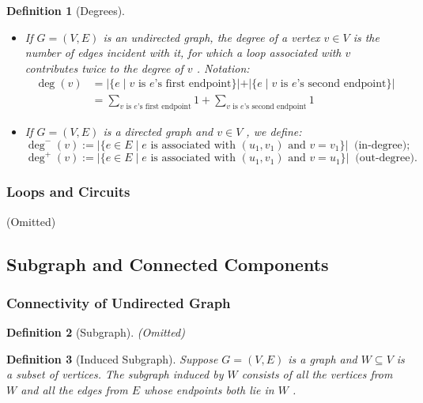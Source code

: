 \documentclass{ctexart}
\newcommand{\。}{．} %
\newenvironment{kuang3}{
    \begin{tcolorbox}[enhanced, breakable, colback=hlan!5!white, boxrule=0pt, frame hidden,
        borderline south={0.5mm}{0.1mm}{hlan}]
    }
    {\end{tcolorbox}}
\newenvironment{lvse}{
    \begin{tcolorbox}[enhanced, breakable, colback=qlv, boxrule=0pt, frame hidden,
        borderline west={0.7mm}{0.1mm}{slv}]
    }
    {\end{tcolorbox}}
\theoremstyle{t} %
\newtheorem{dyhj}{\color{slv} Definition}[subsection] %
\newenvironment{dy}{\begin{lvse}\begin{dyhj}}{\end{dyhj}\end{lvse}}
\begin{document}
\begin{dy}[Degrees]
    \begin{itemize}
        \item If  $ G = (V, E) $  is an undirected graph, the degree of a vertex  $ v \in V $  is the number of edges incident with it, for which a loop associated with  $ v $  contributes twice to the degree of  $ v $ . Notation: 
        \begin{align*}
            \deg(v) &= \left|\{e \mid v \text{ is } e\text{'s first endpoint}\}| + |\{e \mid v \text{ is } e\text{'s second endpoint}\}\right| \\
            &= \sum_{v \text{ is } e\text{'s first endpoint}} 1 + \sum_{v \text{ is } e\text{'s second endpoint}} 1 
        \end{align*} 
        \item If  $ G = (V, E) $  is a directed graph and  $ v \in V $ , we define:
        $$ \deg^{-}(v) := \left|\{e \in E \mid e \text{ is associated with } (u_1, v_1) \text{ and } v = v_1\}\right|\ \text{ (in-degree)}; $$ 
        $$ \deg^{+}(v) := \left|\{e \in E \mid e \text{ is associated with } (u_1, v_1) \text{ and } v = u_1\}\right|\ \text{ (out-degree)}. $$ 
    \end{itemize}
\end{dy}

\subsubsection{Loops and Circuits}

(Omitted)

\begin{kuang3}
    \subsection{Subgraph and Connected Components}
\end{kuang3}

\subsubsection{Connectivity of Undirected Graph}

\begin{dy}[Subgraph]
    (Omitted)
\end{dy}

\begin{dy}[Induced Subgraph]
    Suppose  $ G = (V, E) $  is a graph and  $ W \subseteq V $  is a subset of vertices. The subgraph induced by  $ W $  consists of all the vertices from  $ W $  and all the edges from  $ E $  whose endpoints both lie in  $ W $ .
\end{dy}
\end{document}
